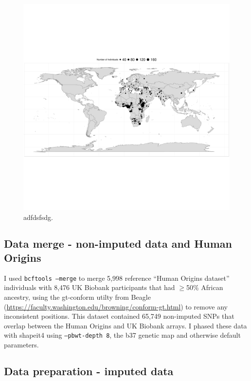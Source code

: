 \begin{figure}
    \centering
    \includegraphics[width=1.0\textwidth]{../images/chapter3/HumanOriginsMap.pdf}
    \caption{adfdsfsdg.}
    \label{fig:HumanOriginsMap}
\end{figure}

\subsection{Data merge - non-imputed data and Human Origins}

I used \texttt{bcftools --merge} to merge 5,998 reference ``Human Origins dataset'' individuals with 8,476 UK Biobank participants that had $\geq$50\% African ancestry, using the gt-conform utilty from Beagle (\url{https://faculty.washington.edu/browning/conform-gt.html}) to remove any inconsistent positions. This dataset contained 65,749 non-imputed SNPs that overlap between the Human Origins and UK Biobank arrays. I phased these data with shapeit4 \cite{delaneau2018integrative} using \texttt{--pbwt-depth 8}, the b37 genetic map and otherwise default parameters.


\subsection{Data preparation - imputed data}

